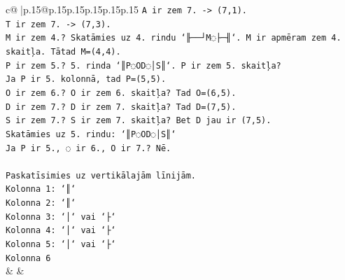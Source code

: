 \documentclass{article}
\begin{document}
{\begin{supertabular}{c@{$\;$}|p{.15\linewidth}@{}p{.15\linewidth}p{.15\linewidth}p{.15\linewidth}p{.15\linewidth}p{.15\linewidth}}
{{{\texttt{A ir zem 7. {-}> (7,1).} \\
\texttt{T ir zem 7. {-}> (7,3).} \\
\texttt{M ir zem 4.? Skatāmies uz 4. rindu `╟──┘M◌├─╢`. M ir apmēram zem 4. skaitļa. Tātad M=(4,4).} \\
\texttt{P ir zem 5.? 5. rinda `║P◌OD◌│S║`. P ir zem 5. skaitļa?} \\
\texttt{Ja P ir 5. kolonnā, tad P=(5,5).} \\
\texttt{O ir zem 6.? O ir zem 6. skaitļa? Tad O=(6,5).} \\
\texttt{D ir zem 7.? D ir zem 7. skaitļa? Tad D=(7,5).} \\
\texttt{S ir zem 7.? S ir zem 7. skaitļa? Bet D jau ir (7,5).} \\
\texttt{Skatāmies uz 5. rindu: `║P◌OD◌│S║`} \\
\texttt{Ja P ir 5., ◌ ir 6., O ir 7.? Nē.} \\
\\ 
\texttt{Paskatīsimies uz vertikālajām līnijām.} \\
\texttt{Kolonna 1: `║`} \\
\texttt{Kolonna 2: `║`} \\
\texttt{Kolonna 3: `│` vai `├`} \\
\texttt{Kolonna 4: `│` vai `├`} \\
\texttt{Kolonna 5: `│` vai `├`} \\
\texttt{Kolonna 6} \\
            }
        }
    }
    & & \\ \\


\end{supertabular}}
\end{document}
